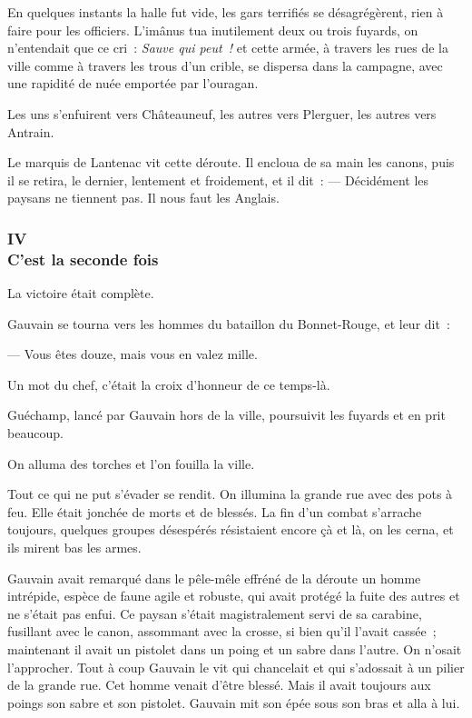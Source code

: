 \documentclass[french,twoside]{book} %
\begin{document}
En quelques instants la halle fut vide, les gars terrifiés se désagrégèrent, rien à faire pour les officiers. L’imânus tua inutilement deux ou trois fuyards, on n’entendait que ce cri : \emph{Sauve qui peut !} et cette armée, à travers les rues de la ville comme à travers les trous d’un crible, se dispersa dans la campagne, avec une rapidité de nuée emportée par l’ouragan.\par
Les uns s’enfuirent vers Châteauneuf, les autres vers Plerguer, les autres vers Antrain.\par
Le marquis de Lantenac vit cette déroute. Il encloua de sa main les canons, puis il se retira, le dernier, lentement et froidement, et il dit : — Décidément les paysans ne tiennent pas. Il nous faut les Anglais.
 \subsubsection[{IV. C’est la seconde fois}]{IV \\
C’est la seconde fois}
\label{p3l2c4}
\noindent La victoire était complète.\par
Gauvain se tourna vers les hommes du bataillon du Bonnet-Rouge, et leur dit :\par
— Vous êtes douze, mais vous en valez mille.\par
Un mot du chef, c’était la croix d’honneur de ce temps-là.\par
Guéchamp, lancé par Gauvain hors de la ville, poursuivit les fuyards et en prit beaucoup.\par
On alluma des torches et l’on fouilla la ville.\par
Tout ce qui ne put s’évader se rendit. On illumina la grande rue avec des pots à feu. Elle était jonchée de morts et de blessés. La fin d’un combat s’arrache toujours, quelques groupes désespérés résistaient encore çà et là, on les cerna, et ils mirent bas les armes.\par
Gauvain avait remarqué dans le pêle-mêle effréné de la déroute un homme intrépide, espèce de faune agile et robuste, qui avait protégé la fuite des autres et ne s’était pas enfui. Ce paysan s’était magistralement servi de sa carabine, fusillant avec le canon, assommant avec la crosse, si bien qu’il l’avait cassée ;  maintenant il avait un pistolet dans un poing et un sabre dans l’autre. On n’osait l’approcher. Tout à coup Gauvain le vit qui chancelait et qui s’adossait à un pilier de la grande rue. Cet homme venait d’être blessé. Mais il avait toujours aux poings son sabre et son pistolet. Gauvain mit son épée sous son bras et alla à lui.\par
\end{document}
